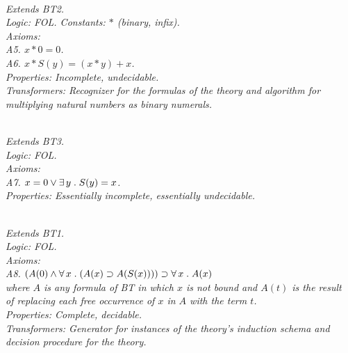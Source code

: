 \documentclass[fleqn]{llncs}
\begin{document}
\begin{biformthy}\em\ \\
Extends BT2.\\
\emph{Logic}: FOL. \emph{Constants}: $*$ (binary, infix).\\
\emph{Axioms}:\\
\indent A5. $x * 0 = 0$.\\
\indent A6. $x * S(y) = (x * y) + x$.\\
\emph{Properties}: Incomplete, undecidable.\\
\emph{Transformers}: Recognizer for the formulas of the theory and  
algorithm for multiplying natural numbers as binary numerals.
\end{biformthy}

\begin{biformthy}\em\ \\
Extends BT3.\\
\emph{Logic}: FOL.\\
\emph{Axioms}:\\
\indent A7. $x = 0 \vee \exists\, y \mathrel. S(y) = x$.\\
\emph{Properties}: Essentially incomplete, essentially undecidable.
\end{biformthy}

\begin{biformthy}\em\ \\
Extends BT1.\\
\emph{Logic}: FOL.\\
\emph{Axioms}:\\
\indent A8. $(A(0) \wedge \forall\, x \mathrel. (A(x) \supset A(S(x))))
\supset \forall\, x \mathrel. A(x)$\\
\indent
where $A$ is any formula of BT{\thebiformthy} in which $x$ is not bound and $A(t)$
is the result\\
\indent
of replacing each free occurrence of $x$ in $A$ with the term $t$.\\
\emph{Properties}: Complete, decidable.\\
\emph{Transformers}: Generator for instances of the theory's induction schema 
and decision procedure for the theory.
\end{biformthy}
\end{document}
